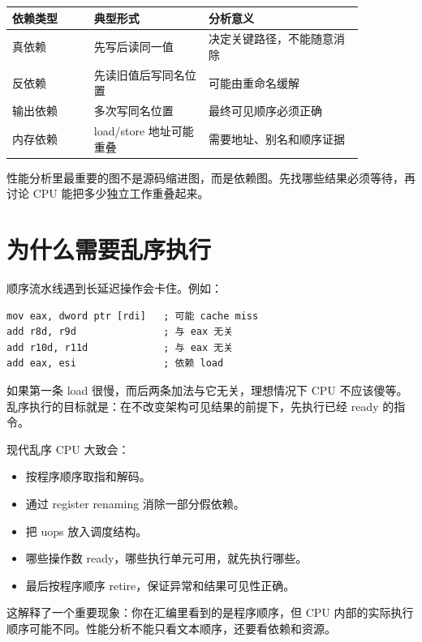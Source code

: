 \begin{center}
\begin{tabular}{p{0.20\linewidth}p{0.28\linewidth}p{0.38\linewidth}}
\toprule
依赖类型 & 典型形式 & 分析意义 \\
\midrule
真依赖 & 先写后读同一值 & 决定关键路径，不能随意消除 \\
反依赖 & 先读旧值后写同名位置 & 可能由重命名缓解 \\
输出依赖 & 多次写同名位置 & 最终可见顺序必须正确 \\
内存依赖 & load/store 地址可能重叠 & 需要地址、别名和顺序证据 \\
\bottomrule
\end{tabular}
\end{center}

\begin{mentalmodel}
性能分析里最重要的图不是源码缩进图，而是依赖图。先找哪些结果必须等待，再讨论 CPU 能把多少独立工作重叠起来。
\end{mentalmodel}

\section{为什么需要乱序执行}

顺序流水线遇到长延迟操作会卡住。例如：

\begin{lstlisting}
mov eax, dword ptr [rdi]   ; 可能 cache miss
add r8d, r9d               ; 与 eax 无关
add r10d, r11d             ; 与 eax 无关
add eax, esi               ; 依赖 load
\end{lstlisting}

如果第一条 load 很慢，而后两条加法与它无关，理想情况下 CPU 不应该傻等。乱序执行的目标就是：在不改变架构可见结果的前提下，先执行已经 ready 的指令。

现代乱序 CPU 大致会：

\begin{itemize}
  \item 按程序顺序取指和解码。
  \item 通过 register renaming 消除一部分假依赖。
  \item 把 uops 放入调度结构。
  \item 哪些操作数 ready，哪些执行单元可用，就先执行哪些。
  \item 最后按程序顺序 retire，保证异常和结果可见性正确。
\end{itemize}

这解释了一个重要现象：你在汇编里看到的是程序顺序，但 CPU 内部的实际执行顺序可能不同。性能分析不能只看文本顺序，还要看依赖和资源。

